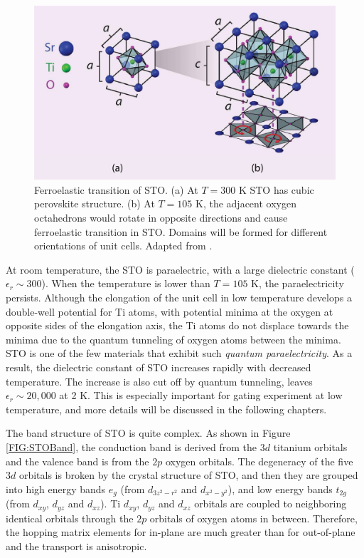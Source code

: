 \documentclass[pdflatex, sectionletters, 12pt]{pittetd}    %
\begin{document}
\begin{figure}[h!]
	\centering
	\includegraphics[width=.80\textwidth]{Drawing/STOPhaseTransition.pdf}
	\caption{Ferroelastic transition of STO. (a) At $T=300$ K STO has cubic perovskite structure. (b) At $T = 105$ K, the adjacent oxygen octahedrons would rotate in opposite directions and cause ferroelastic transition in STO. Domains will be formed for different orientations of unit cells. Adapted from \cite{sulpizio2014nanoscale}.}
	\label{FIG:STOPhaseTransition}
\end{figure}

At room temperature, the STO is paraelectric, with a large dielectric constant ($\epsilon_r \sim 300$).  When the temperature is lower than $T=105$ K, the paraelectricity persists. Although the elongation of the unit cell in low temperature develops a double-well potential for Ti atoms, with potential minima at the oxygen at opposite sides of the elongation axis, the Ti atoms do not displace towards the minima due to the quantum tunneling of oxygen atoms\cite{sulpizio2014nanoscale} between the minima. STO is one of the few materials that exhibit such \emph{quantum paraelectricity}\cite{muller1979srti}. As a result, the dielectric constant of STO increases rapidly with decreased temperature. The increase is also cut off by quantum tunneling, leaves $\epsilon_r \sim 20,000$\cite{sakudo1971dielectric} at 2 K. This is especially important for gating experiment at low temperature, and more details will be discussed in the following chapters.

The band structure of STO is quite complex. As shown in Figure \ref{FIG:STOBand}, the conduction band is derived from the $3d$ titanium orbitals and the valence band is from the $2p$ oxygen orbitals. The degeneracy of the five $3d$ orbitals is broken by the crystal structure of STO, and then they are grouped into high energy bands $e_g$ (from $d_{3z^2 - r^2}$ and $d_{x^2-y^2}$), and low energy bands $t_{2g}$ (from $d_{xy}$, $d_{yz}$ and $d_{xz}$). Ti $d_{xy}$, $d_{yz}$ and $d_{xz}$ orbitals are coupled to neighboring identical orbitals through the $2p$ orbitals of oxygen atoms in between. Therefore, the hopping matrix elements for in-plane are much greater than for out-of-plane and the transport is anisotropic\cite{sulpizio2014nanoscale}. 
\end{document}
